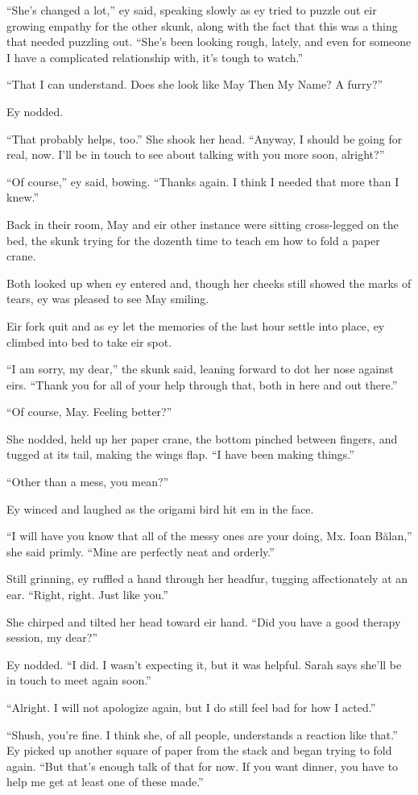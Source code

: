 ``She's changed a lot,'' ey said, speaking slowly as ey tried to puzzle out eir growing empathy for the other skunk, along with the fact that this was a thing that needed puzzling out. ``She's been looking rough, lately, and even for someone I have a complicated relationship with, it's tough to watch.''

``That I can understand. Does she look like May Then My Name? A furry?''

Ey nodded.

``That probably helps, too.'' She shook her head. ``Anyway, I should be going for real, now. I'll be in touch to see about talking with you more soon, alright?''

``Of course,'' ey said, bowing. ``Thanks again. I think I needed that more than I knew.''

Back in their room, May and eir other instance were sitting cross-legged on the bed, the skunk trying for the dozenth time to teach em how to fold a paper crane.

Both looked up when ey entered and, though her cheeks still showed the marks of tears, ey was pleased to see May smiling.

Eir fork quit and as ey let the memories of the last hour settle into place, ey climbed into bed to take eir spot.

``I am sorry, my dear,'' the skunk said, leaning forward to dot her nose against eirs. ``Thank you for all of your help through that, both in here and out there.''

``Of course, May. Feeling better?''

She nodded, held up her paper crane, the bottom pinched between fingers, and tugged at its tail, making the wings flap. ``I have been making things.''

``Other than a mess, you mean?''

Ey winced and laughed as the origami bird hit em in the face.

``I will have you know that all of the messy ones are your doing, Mx. Ioan Bălan,'' she said primly. ``Mine are perfectly neat and orderly.''

Still grinning, ey ruffled a hand through her headfur, tugging affectionately at an ear. ``Right, right. Just like you.''

She chirped and tilted her head toward eir hand. ``Did you have a good therapy session, my dear?''

Ey nodded. ``I did. I wasn't expecting it, but it was helpful. Sarah says she'll be in touch to meet again soon.''

``Alright. I will not apologize again, but I do still feel bad for how I acted.''

``Shush, you're fine. I think she, of all people, understands a reaction like that.'' Ey picked up another square of paper from the stack and began trying to fold again. ``But that's enough talk of that for now. If you want dinner, you have to help me get at least one of these made.''
